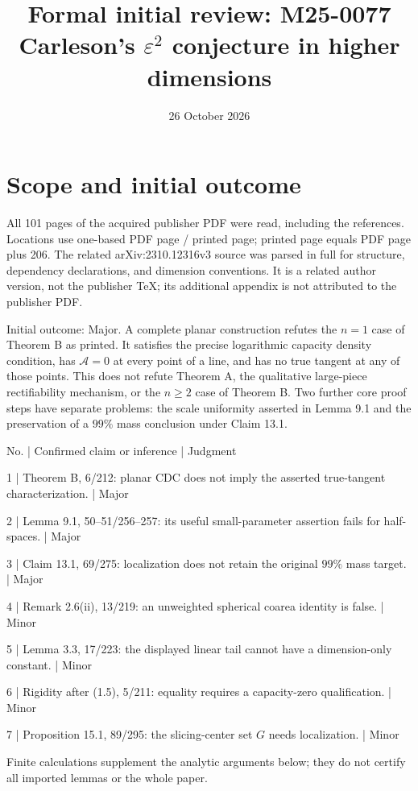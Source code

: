 \documentclass[10pt]{article}
\title{Formal initial review: M25-0077
Carleson’s \(\varepsilon^2\) conjecture in higher dimensions}
\author{}
\date{26 October 2026}
\begin{document}
\maketitle
\section*{Scope and initial outcome}
All 101 pages of the acquired publisher PDF were read, including the references. Locations use one-based PDF page / printed page; printed page equals PDF page plus 206. The related arXiv:2310.12316v3 source was parsed in full for structure, dependency declarations, and dimension conventions. It is a related author version, not the publisher TeX; its additional appendix is not attributed to the publisher PDF.\par
Initial outcome: Major. A complete planar construction refutes the \(n=1\) case of Theorem B as printed. It satisfies the precise logarithmic capacity density condition, has \(\mathcal A=0\) at every point of a line, and has no true tangent at any of those points. This does not refute Theorem A, the qualitative large-piece rectifiability mechanism, or the \(n\ge2\) case of Theorem B. Two further core proof steps have separate problems: the scale uniformity asserted in Lemma 9.1 and the preservation of a \(99\%\) mass conclusion under Claim 13.1.\par
No. | Confirmed claim or inference | Judgment\par
1 | Theorem B, 6/212: planar CDC does not imply the asserted true-tangent characterization. | Major\par
2 | Lemma 9.1, 50–51/256–257: its useful small-parameter assertion fails for half-spaces. | Major\par
3 | Claim 13.1, 69/275: localization does not retain the original \(99\%\) mass target. | Major\par
4 | Remark 2.6(ii), 13/219: an unweighted spherical coarea identity is false. | Minor\par
5 | Lemma 3.3, 17/223: the displayed linear tail cannot have a dimension-only constant. | Minor\par
6 | Rigidity after (1.5), 5/211: equality requires a capacity-zero qualification. | Minor\par
7 | Proposition 15.1, 89/295: the slicing-center set \(G\) needs localization. | Minor\par
Finite calculations supplement the analytic arguments below; they do not certify all imported lemmas or the whole paper.\par
\end{document}
